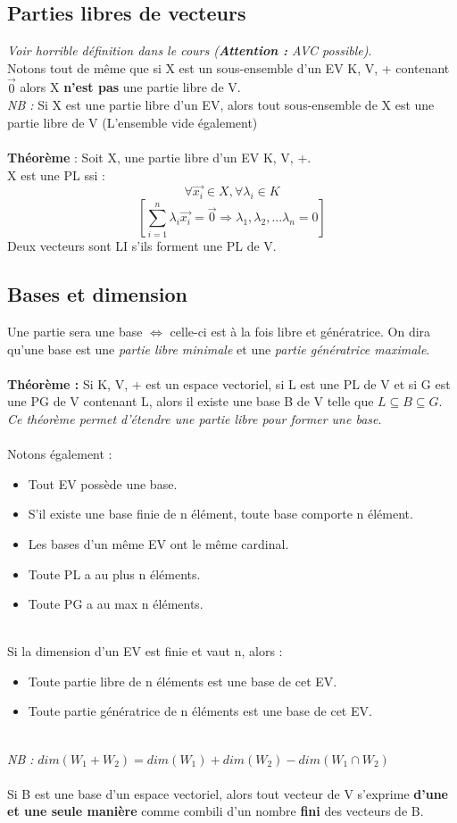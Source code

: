 \documentclass[12pt, a4paper]{article}
\begin{document}
\subsection{Parties libres de vecteurs}
\textit{Voir horrible définition dans le cours (\textbf{Attention :} AVC possible)}.\\
Notons tout de même que si X est un sous-ensemble d'un EV K, V, + contenant $\vec{0}$ alors X \textbf{n'est pas} une partie libre de V.\\
\textit{NB :} Si X est une partie libre d'un EV, alors tout sous-ensemble de X est une partie libre de V (L'ensemble vide également)\\\\
\textbf{Théorème } : Soit X, une partie libre d'un EV K, V, +.\\
X est une PL ssi :
$$\forall \vec{x_{i}} \in X, \forall \lambda_{i} \in K$$
$$[\sum_{i=1}^{n} \lambda_{i}\vec{x_{i}} = \vec{0} \Rightarrow \lambda_{1}, \lambda_{2}, ... \lambda_{n} = 0]$$
Deux vecteurs sont LI s'ils forment une PL de V.

\subsection{Bases et dimension}
Une partie sera une base $\Leftrightarrow$ celle-ci est à la fois libre et génératrice. On dira qu'une base est une \textit{partie libre minimale} et une \textit{partie génératrice maximale}.\\\\
\textbf{Théorème :} Si K, V, + est un espace vectoriel, si L est une PL de V et si G est une PG de V contenant L, alors il existe une base B de V telle que $L \subseteq B \subseteq G$.\\
\textit{Ce théorème permet d'étendre une partie libre pour former une base}.\\\\
Notons également :
\begin{itemize}
\item Tout EV possède une base.
\item S'il existe une base finie de n élément, toute base comporte n élément.
\item Les bases d'un même EV ont le même cardinal.
\item Toute PL a au plus n éléments.
\item Toute PG a au max n éléments.
\end{itemize}
\ \\
Si la dimension d'un EV est finie et vaut n, alors :
\begin{itemize}
\item Toute partie libre de n éléments est une base de cet EV.
\item Toute partie génératrice de n éléments est une base de cet EV.
\end{itemize}
\ \\
\textit{NB :} $dim(W_{1} + W_{2}) = dim(W_{1}) + dim(W_{2}) - dim(W_{1} \cap W_{2})$\\\\
Si B est une base d'un espace vectoriel, alors tout vecteur de V s'exprime \textbf{d'une et une seule manière} comme combili d'un nombre \textbf{fini} des vecteurs de B.
\end{document}
